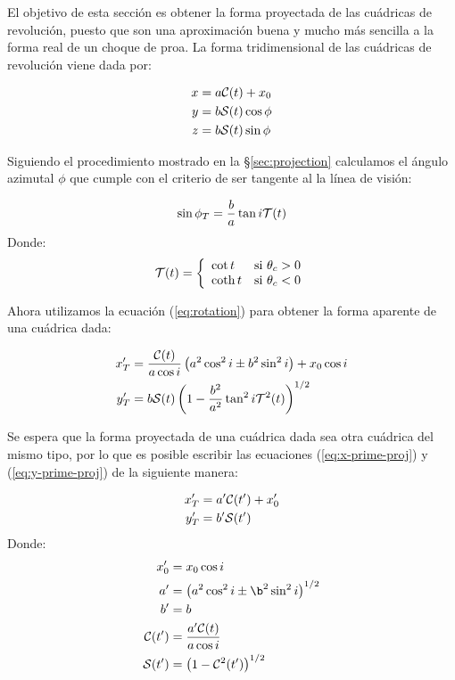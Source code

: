 El objetivo de esta sección es obtener la forma proyectada de las cuádricas de revolución, puesto que son una aproximación buena y mucho más sencilla a la forma real de un choque de proa. La forma tridimensional de las cuádricas de revolución viene dada por:

\begin{align}
  x &= a\mathcal{C}(t) + x_0 \\
  y &= b\mathcal{S}(t)\cos\phi \\
  z &= b\mathcal{S}(t)\sin\phi
\end{align}

Siguiendo el procedimiento mostrado en la \S \ref{sec:projection} calculamos el ángulo azimutal $\phi$ que cumple con el criterio de ser tangente al la línea de visión:

\begin{align}
  \sin\phi_T = \frac{b}{a}\tan i\mathcal{T}(t) 
\end{align}
Donde:
\begin{align}
  \mathcal{T}(t) = \left\lbrace
  \begin{array}{lr}
    \cot t & \mathrm{si}~\theta_c > 0 \\
    \coth t & \mathrm{si}~\theta_c < 0 
  \end{array}
  \right.
\end{align}

Ahora utilizamos la ecuación (\ref{eq:rotation}) para obtener la forma aparente de una cuádrica dada:

\begin{align}
  x'_T &= \frac{\mathcal{C}(t)}{a\cos i}\left(a^2\cos^2 i \pm b^2\sin^2 i\right) + x_0\cos i
  \label{eq:x-prime-proj}\\
  y'_T &= b\mathcal{S}(t)\left(1 - \frac{b^2}{a^2}\tan^2 i\mathcal{T}^2(t)\right)^{1/2}
  \label{eq:y-prime-proj}
\end{align}

Se espera que la forma proyectada de una cuádrica dada sea otra cuádrica del mismo tipo, por lo que es posible escribir las ecuaciones (\ref{eq:x-prime-proj}) y (\ref{eq:y-prime-proj}) de la siguiente manera: 

\begin{align}
  x'_T &= a'\mathcal{C}(t') + x'_0 \label{eq:xtprime}\\
  y'_T &= b'\mathcal{S}(t') \label{eq:ytprime}
\end{align}
Donde:
\begin{align}
  x'_0 &= x_0\cos i \\
  a' &= \left(a^2\cos^2 i \pm \b^2\sin^2 i\right)^{1/2} \label{eq:a-prime}\\
  b' &= b \label{eq:b-prime}\\
  \Cos(t') &= \frac{a'\Cos(t)}{a\cos i} \\
  \Sin(t') &= \left(1 - \Cos^2(t')\right)^{1/2}
\end{align}

